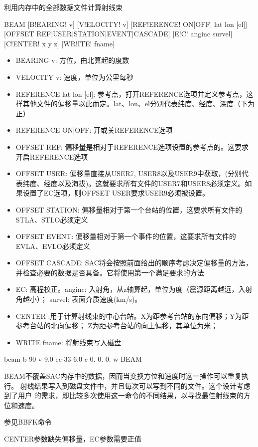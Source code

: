 \label{cmd:beam}

利用内存中的全部数据文件计算射线束

\begin{SACSTX}
BEAM [B!EARING! v] [V!ELOCITY! v] [REF!ERENCE! ON|OFF| lat lon [el]] 
    [OFFSET REF|USER|STATION|EVENT|CASCADE] [E!C! anginc survel] 
    [C!ENTER! x y z] [WR!ITE! fname]
\end{SACSTX}

\begin{itemize}
\item BEARING v: 方位，由北算起的度数
\item VELOCITY v: 速度，单位为公里每秒
\item REFERENCE lat lon [el]: 参考点，打开REFERENCE选项并定义参考点，这样其他文件的偏移量以此而定。lat、lon、el分别代表纬度、经度、深度（下为正）
\item REFERENCE ON|OFF: 开或关REFERENCE选项
\item OFFSET REF: 偏移量是相对于REFERENCE选项设置的参考点的。这要求开启REFERENCE选项
\item OFFSET USER: 偏移量直接从USER7, USER8以及USER9中获取，(分别代表纬度、经度以及海拔)。这就要求所有文件的USER7和USER8必须定义。如果设置了EC选项，则OFFSET USER要求USER9必须被设置。
\item OFFSET STATION: 偏移量相对于第一个台站的位置，这要求所有文件的STLA、STLO必须定义
\item OFFSET EVENT: 偏移量相对于第一个事件的位置，这要求所有文件的EVLA、EVLO必须定义
\item OFFSET CASCADE: SAC将会按照前面给出的顺序考虑决定偏移量的方法，并检查必要的数据是否具备。它将使用第一个满足要求的方法
\item EC: 高程校正。anginc: 入射角，从z轴算起，单位为度（震源距离越远，入射角越小）；
    survel: 表面介质速度(km/s)。
\item CENTER :用于计算射线束的中心台站。X为距参考台站的东向偏移；Y为距参考台站的北向偏移；
	Z为距参考台站的向上偏移，其单位为米；
\item WRITE fname: 将射线束写入磁盘
\end{itemize}

\begin{SACDFT}
beam  b 90  v 9.0 ec 33  6.0 c  0. 0. 0. w BEAM
\end{SACDFT}

BEAM不覆盖SAC内存中的数据，因而当变换方位和速度时这一操作可以重复执行。
射线结果写入到磁盘文件中，并且每次可以写到不同的文件。这个设计考虑到了用户
的需求，即比较多次使用这一命令的不同结果，以寻找最佳射线束的方位和速度。

参见BBFK命令

CENTER参数缺失偏移量，EC参数需要正值

